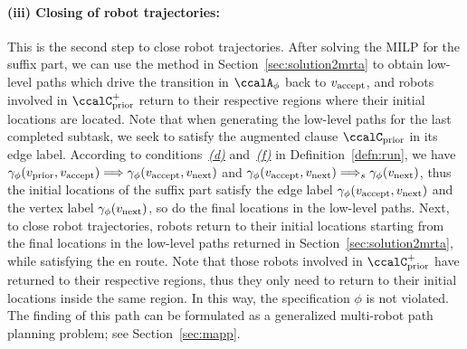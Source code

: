 \documentclass[Afour,sageh,times]{sagej}
\newcommand{\ltl}{ {\it LTL}$_{-\bigcirc}$ }
\newcommand{\autop}{\ccalA_{\phi}}
\newcommand{\vertex}[1]{v_{\textup{#1}}}
\newcommand{\simplies}{\DOTSB\Longrightarrow}
\begin{document}
{{\paragraph{(iii) Closing of robot trajectories:}\label{sec:closing}
This is the second step to close robot trajectories. After solving the MILP for the suffix part, we can use the method in Section~\ref{sec:solution2mrta} to obtain low-level paths which drive the transition in $\autop$ back to $\vertex{accept}$, and robots involved in $\ccalC_{\text{prior}}^+$ return to their respective regions where their initial locations are located. Note that when generating the low-level paths for the last completed subtask, we seek to satisfy  the augmented  clause $\ccalC_{\text{prior}}$  in its edge label. According to conditions~\hyperref[cond:d]{\it (d)} and~\hyperref[cond:f]{\it (f)} in Definition~\ref{defn:run}, we have $\gamma_\phi(\vertex{prior}, \vertex{accept}) \simplies \gamma_\phi(\vertex{accept}, \vertex{next})$ and $\gamma_\phi(\vertex{accept}, \vertex{next}) \simplies_s \gamma_\phi(\vertex{next})$, thus the initial locations of the suffix part satisfy the edge label $\gamma_\phi(\vertex{accept}, \vertex{next})$ and the  vertex label $\gamma_\phi(\vertex{next})$, so do the final locations in the low-level paths. Next, to close robot trajectories, robots return to their initial locations starting from the final locations in the low-level paths returned in Section~\ref{sec:solution2mrta}, while satisfying the  en route. Note that those robots involved in $\ccalC_{\text{prior}}^+$ have returned to their respective regions, thus they only need to return to their initial locations inside the same region. In this way, the specification $\phi$ is not violated. The finding of this path can be formulated as a generalized multi-robot path planning problem; see Section~\ref{sec:mapp}.



}}
\end{document}
